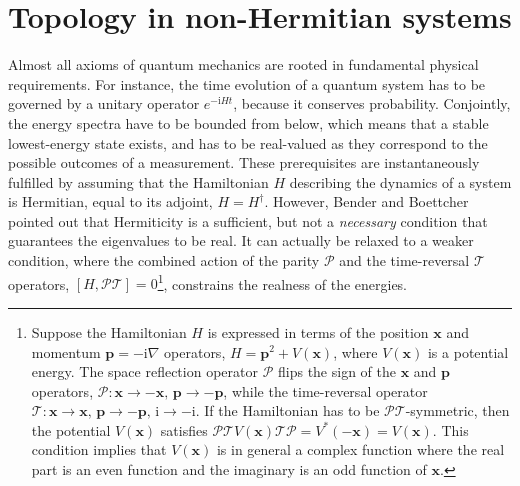 \chapter{Topology in non-Hermitian systems}
\label{ch:nh}
Almost all axioms of quantum mechanics are rooted in fundamental physical requirements. For instance, the time evolution of a quantum system has to be governed by a unitary operator $e^{-\mathrm{i}Ht}$, because it conserves probability. Conjointly, the energy spectra have to be bounded from below, which means that a stable lowest-energy state exists, and has to be real-valued as they correspond to the possible outcomes of a measurement. These prerequisites are instantaneously fulfilled by assuming that the Hamiltonian $H$ describing the dynamics of a system is Hermitian, \ie equal to its adjoint, $H =  H^{\dagger}$. However, Bender and Boettcher~\cite{BenderPT1998} pointed out that Hermiticity is a sufficient, but not a \emph{necessary} condition that guarantees the eigenvalues to be real. It can actually be relaxed to a weaker condition, where the combined action of the parity $\mathcal{P}$ and the time-reversal $\mathcal{T}$ operators, $[H, \mathcal{PT}] = 0$\footnote{Suppose the Hamiltonian $H$ is expressed in terms of the position $\mathbf{x}$ and momentum $\mathbf{p} = - \mathrm{i} \nabla$ operators, $H = \mathbf{p}^2 + V(\mathbf{x})$, where $V(\mathbf{x})$ is a potential energy. The space reflection operator $\mathcal{P}$ flips the sign of the $\mathbf{x}$ and $\mathbf{p}$ operators, $\mathcal{P}: \mathbf{x} \rightarrow - \mathbf{x}, \, \mathbf{p} \rightarrow - \mathbf{p}$, while the time-reversal operator $\mathcal{T}: \mathbf{x} \rightarrow \mathbf{x}, \, \mathbf{p} \rightarrow - \mathbf{p}, \, \mathrm{i} \rightarrow - \mathrm{i}$. If the Hamiltonian has to be $\mathcal{PT}$-symmetric, then the potential $V(\mathbf{x})$ satisfies $ \mathcal{PT} V( \mathbf{x} )\mathcal{TP} = V^* (- \mathbf{x} ) = V (\mathbf{x} )$. This condition implies that $V(\mathbf{x})$ is in general a complex function where the real part is an even function and the imaginary is an odd function of $ \mathbf{x}$.}, constrains the realness of the energies. 

